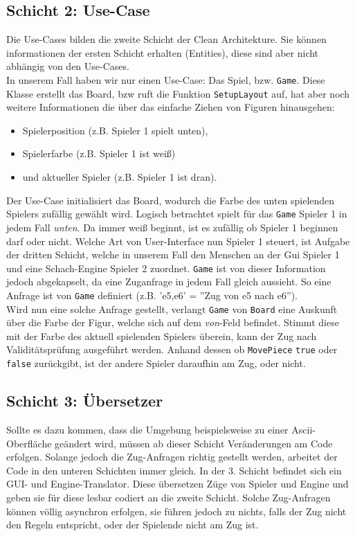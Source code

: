 \documentclass[
10pt, %
a4paper, %
oneside, %
headinclude,footinclude, %
BCOR5mm, %
]{scrartcl}
\begin{document}
\subsection{Schicht 2: Use-Case}
Die Use-Cases bilden die zweite Schicht der Clean Architekture. Sie können informationen der ersten Schicht erhalten (Entities), diese sind aber nicht abhängig von den Use-Cases.\\
In unserem Fall haben wir nur einen Use-Case: Das Spiel, bzw. \texttt{Game}. Diese Klasse erstellt das Board, bzw ruft die Funktion \texttt{SetupLayout} auf, hat aber noch weitere Informationen die über das einfache Ziehen von Figuren hinausgehen:
\begin{center}
	\begin{itemize}
		\item Spielerposition (z.B. Spieler 1 spielt unten),
		\item Spielerfarbe (z.B. Spieler 1 ist weiß)
		\item und aktueller Spieler (z.B. Spieler 1 ist dran).
	\end{itemize}
\end{center}
Der Use-Case initialisiert das Board, wodurch die Farbe des unten spielenden Spielers zufällig gewählt wird. Logisch betrachtet spielt für das \texttt{Game} Spieler 1 in jedem Fall \textit{unten}. Da immer weiß beginnt, ist es zufällig ob Spieler 1 beginnen darf oder nicht. Welche Art von User-Interface nun Spieler 1 steuert, ist Aufgabe der dritten Schicht, welche in unserem Fall den Menschen an der Gui Spieler 1 und eine Schach-Engine Spieler 2 zuordnet. \texttt{Game} ist von dieser Information jedoch abgekapselt, da eine Zuganfrage in jedem Fall gleich aussieht.
So eine Anfrage ist von \texttt{Game} definiert (z.B. 'e5,e6' = ''Zug von e5 nach e6''). \\
Wird nun eine solche Anfrage gestellt, verlangt \texttt{Game} von \texttt{Board} eine Auskunft über die Farbe der Figur, welche sich auf dem \textit{von}-Feld befindet. Stimmt diese mit der Farbe des aktuell spielenden Spielers überein, kann der Zug nach Validitätsprüfung ausgeführt werden. Anhand dessen ob \texttt{MovePiece} \texttt{true} oder \texttt{false} zurückgibt, ist der andere Spieler daraufhin am Zug, oder nicht.
\subsection{Schicht 3: Übersetzer}
Sollte es dazu kommen, dass die Umgebung beispielsweise zu einer Ascii-Oberfläche geändert wird, müssen ab dieser Schicht Veränderungen am Code erfolgen. Solange jedoch die Zug-Anfragen richtig gestellt werden, arbeitet der Code in den unteren Schichten immer gleich. In der 3. Schicht befindet sich ein GUI- und Engine-Translator. Diese übersetzen Züge von Spieler und Engine und geben sie für diese lesbar codiert an die zweite Schicht. 
Solche Zug-Anfragen können völlig asynchron erfolgen, sie führen jedoch zu nichts, falls der Zug nicht den Regeln entspricht, oder der Spielende nicht am Zug ist.
\end{document}
